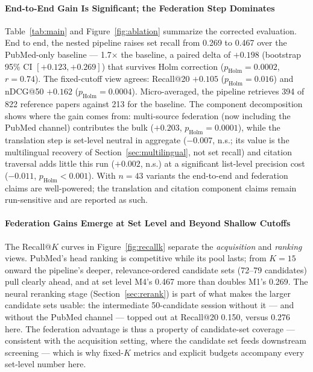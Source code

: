 \documentclass[sigconf,screen]{acmart}
\begin{document}
\paragraph{End-to-End Gain Is Significant; the Federation Step Dominates}
Table~\ref{tab:main} and Figure~\ref{fig:ablation} summarize the corrected
evaluation. End to end, the nested pipeline raises set recall from 0.269
to 0.467 over the PubMed-only baseline --- 1.7$\times$ the baseline, a
paired delta of $+0.198$ (bootstrap 95\% CI $[+0.123, +0.269]$) that
survives Holm correction ($p_{\text{Holm}}{=}0.0002$, $r{=}0.74$). The
fixed-cutoff view agrees: Recall@20 $+0.105$
($p_{\text{Holm}}{=}0.016$) and nDCG@50 $+0.162$
($p_{\text{Holm}}{=}0.0004$). Micro-averaged, the pipeline retrieves 394
of 822 reference papers against 213 for the baseline. The component
decomposition shows where the gain comes from: multi-source federation
(now including the PubMed channel) contributes the bulk
($+0.203$, $p_{\text{Holm}}{=}0.0001$), while the translation step is
set-level neutral in aggregate ($-0.007$, n.s.; its value is the
multilingual recovery of Section~\ref{sec:multilingual}, not set recall)
and citation traversal adds little this run ($+0.002$, n.s.) at a
significant list-level precision cost ($-0.011$,
$p_{\text{Holm}}{<}0.001$). With $n{=}43$ variants the end-to-end and
federation claims are well-powered; the translation and citation component
claims remain run-sensitive and are reported as such.

\paragraph{Federation Gains Emerge at Set Level and Beyond Shallow Cutoffs}
The Recall@$K$ curves in Figure~\ref{fig:recallk} separate the
\emph{acquisition} and \emph{ranking} views. PubMed's head ranking is
competitive while its pool lasts; from $K{=}15$ onward the pipeline's
deeper, relevance-ordered candidate sets (72--79 candidates) pull clearly
ahead, and at set level M4's 0.467 more than doubles M1's 0.269. The
neural reranking stage (Section~\ref{sec:rerank}) is part of what makes
the larger candidate sets usable: the intermediate 50-candidate session
without it --- and without the PubMed channel --- topped out at Recall@20
0.150, versus 0.276 here. The federation advantage is thus a property of
candidate-set coverage --- consistent with the acquisition setting, where
the candidate set feeds downstream screening --- which is why fixed-$K$
metrics and explicit budgets accompany every set-level number here.
\end{document}
